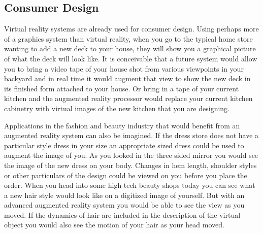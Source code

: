 \subsection{Consumer Design}

Virtual reality systems are already used for consumer design. Using perhaps more of a graphics system than virtual reality, when you go to the typical home store wanting to add a new deck to your house, they will show you a graphical picture of what the deck will look like. It is conceivable that a future system would allow you to bring a video tape of your house shot from various viewpoints in your backyard and in real time it would augment that view to show the new deck in its finished form attached to your house. Or bring in a tape of your current kitchen and the augmented reality processor would replace your current kitchen cabinetry with virtual images of the new kitchen that you are designing.

Applications in the fashion and beauty industry that would benefit from an augmented reality system can also be imagined. If the dress store does not have a particular style dress in your size an appropriate sized dress could be used to augment the image of you. As you looked in the three sided mirror you would see the image of the new dress on your body. Changes in hem length, shoulder styles or other particulars of the design could be viewed on you before you place the order. When you head into some high-tech beauty shops today you can see what a new hair style would look like on a digitized image of yourself. But with an advanced augmented reality system you would be able to see the view as you moved. If the dynamics of hair are included in the description of the virtual object you would also see the motion of your hair as your head moved.